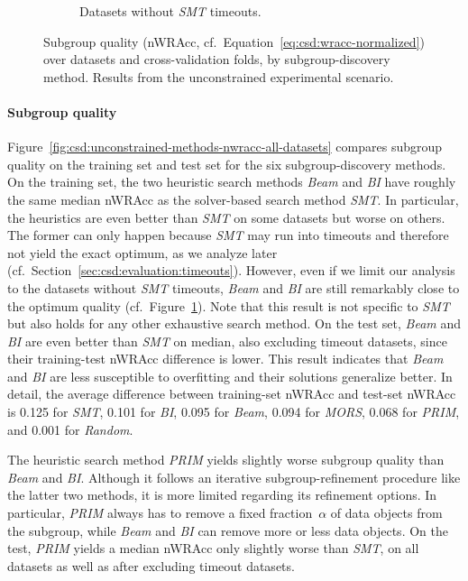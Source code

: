 \documentclass{article}
\theoremstyle{definition}
\begin{document}
\begin{figure}[t]
\begin{subfigure}[t]{0.48\textwidth}
		\caption{Datasets without \emph{SMT} timeouts.}
		\label{fig:csd:unconstrained-methods-nwracc-no-timeout-datasets}
	\end{subfigure}
	\caption{
		Subgroup quality (nWRAcc, cf.~Equation~\ref{eq:csd:wracc-normalized}) over datasets and cross-validation folds, by subgroup-discovery method.
		Results from the unconstrained experimental scenario.
	}
	\label{fig:csd:unconstrained-methods-nwracc}
\end{figure}

\paragraph{Subgroup quality}

Figure~\ref{fig:csd:unconstrained-methods-nwracc-all-datasets} compares subgroup quality on the training set and test set for the six subgroup-discovery methods.
On the training set, the two heuristic search methods \emph{Beam} and \emph{BI} have roughly the same median nWRAcc as the solver-based search method \emph{SMT}.
In particular, the heuristics are even better than \emph{SMT} on some datasets but worse on others.
The former can only happen because \emph{SMT} may run into timeouts and therefore not yield the exact optimum, as we analyze later (cf.~Section~\ref{sec:csd:evaluation:timeouts}).
However, even if we limit our analysis to the datasets without \emph{SMT} timeouts, \emph{Beam} and \emph{BI} are still remarkably close to the optimum quality (cf.~Figure~\ref{fig:csd:unconstrained-methods-nwracc-no-timeout-datasets}).
Note that this result is not specific to \emph{SMT} but also holds for any other exhaustive search method.
On the test set, \emph{Beam} and \emph{BI} are even better than \emph{SMT} on median, also excluding timeout datasets, since their training-test nWRAcc difference is lower.
This result indicates that \emph{Beam} and \emph{BI} are less susceptible to overfitting and their solutions generalize better.
In detail, the average difference between training-set nWRAcc and test-set nWRAcc is 0.125 for \emph{SMT}, 0.101 for \emph{BI}, 0.095 for \emph{Beam}, 0.094 for \emph{MORS}, 0.068 for \emph{PRIM}, and 0.001 for \emph{Random}.

The heuristic search method \emph{PRIM} yields slightly worse subgroup quality than \emph{Beam} and \emph{BI}.
Although it follows an iterative subgroup-refinement procedure like the latter two methods, it is more limited regarding its refinement options.
In particular, \emph{PRIM} always has to remove a fixed fraction~$\alpha$ of data objects from the subgroup, while \emph{Beam} and \emph{BI} can remove more or less data objects.
On the test, \emph{PRIM} yields a median nWRAcc only slightly worse than \emph{SMT}, on all datasets as well as after excluding timeout datasets.
\end{document}
